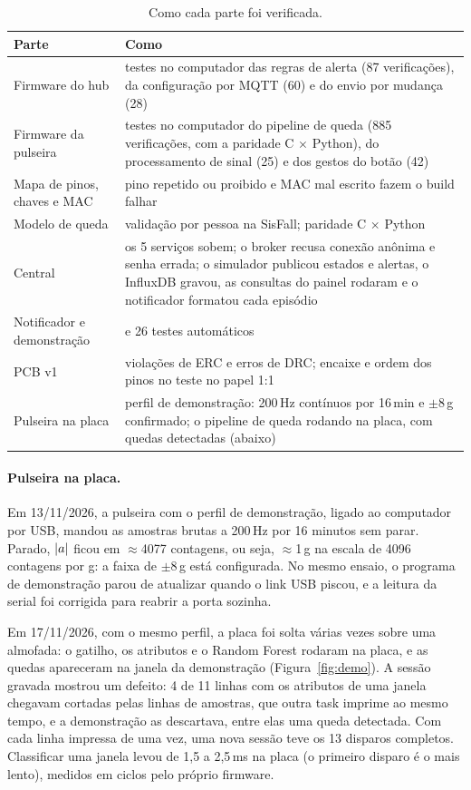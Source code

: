 \begin{table}[H]
\centering
\caption{Como cada parte foi verificada.}
\label{tab:verificado}
\small
\begin{tabular}{@{}>{\raggedright\arraybackslash}p{4.0cm}>{\raggedright\arraybackslash}p{9.8cm}@{}}
\toprule
Parte & Como \\
\midrule
Firmware do hub & testes no computador das regras de alerta (87 verificações), da configuração por MQTT (60) e do envio por mudança (28) \\
Firmware da pulseira & testes no computador do pipeline de queda (885 verificações, com a paridade C $\times$ Python), do processamento de sinal (25) e dos gestos do botão (42) \\
Mapa de pinos, chaves e MAC & pino repetido ou proibido e MAC mal escrito fazem o build falhar \\
Modelo de queda & validação por pessoa na SisFall; paridade C $\times$ Python \\
Central & os 5 serviços sobem; o broker recusa conexão anônima e senha errada; o simulador publicou estados e alertas, o InfluxDB gravou, as consultas do painel rodaram e o notificador formatou cada episódio \\
Notificador e demonstração & 22 e 26 testes automáticos \\
PCB v1 & \ercViolacoes{} violações de ERC e \drcErros{} erros de DRC; encaixe e ordem dos pinos no teste no papel 1:1 \\
Pulseira na placa & perfil de demonstração: 200\,Hz contínuos por 16\,min e $\pm$8\,g confirmado; o pipeline de queda rodando na placa, com quedas detectadas (abaixo) \\
\bottomrule
\end{tabular}
\end{table}

\paragraph{Pulseira na placa.} Em 13/11/2026, a pulseira com o perfil de demonstração,
ligado ao computador por USB, mandou as amostras brutas a 200\,Hz por 16 minutos sem parar.
Parado, $|a|$ ficou em $\approx$4077 contagens, ou seja, $\approx$1\,g na escala de
4096 contagens por g: a faixa de $\pm$8\,g está configurada. No mesmo ensaio, o programa de
demonstração parou de atualizar quando o link USB piscou, e a leitura da serial foi corrigida
para reabrir a porta sozinha.

Em 17/11/2026, com o mesmo perfil, a placa foi solta várias vezes sobre uma almofada: o
gatilho, os atributos e o Random Forest rodaram na placa, e as quedas apareceram na janela da
demonstração (Figura~\ref{fig:demo}). A sessão gravada mostrou um defeito: 4 de 11 linhas com
os atributos de uma janela chegavam cortadas pelas linhas de amostras, que outra task imprime
ao mesmo tempo, e a demonstração as descartava, entre elas uma queda detectada. Com cada linha
impressa de uma vez, uma nova sessão teve os 13 disparos completos. Classificar uma janela
levou de 1,5 a 2,5\,ms na placa (o primeiro disparo é o mais lento), medidos em ciclos pelo
próprio firmware.

